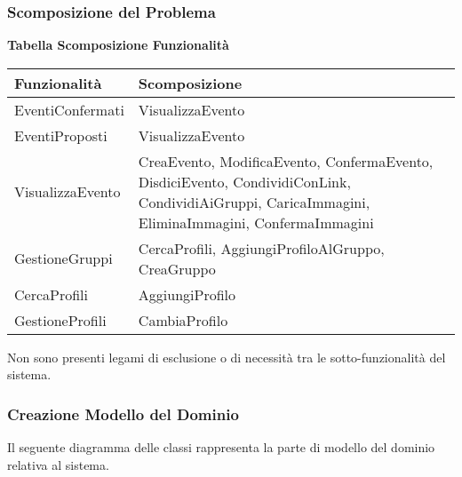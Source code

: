 \subsubsection{Scomposizione del Problema}
\hfill \break

\textbf{Tabella Scomposizione Funzionalità}
\hfill \break

\begin{tabular} {|P{7cm}|P{7cm}|}
    \hline
    \textbf{Funzionalità} & \textbf{Scomposizione}                                                                                                                            \\
    \hline
    EventiConfermati      & VisualizzaEvento                                                                                                                                  \\
    \hline
    EventiProposti        & VisualizzaEvento                                                                                                                                  \\
    \hline
    VisualizzaEvento      & CreaEvento, ModificaEvento, ConfermaEvento, DisdiciEvento, CondividiConLink, CondividiAiGruppi, CaricaImmagini, EliminaImmagini, ConfermaImmagini \\
    \hline
    GestioneGruppi        & CercaProfili, AggiungiProfiloAlGruppo, CreaGruppo                                                                                                 \\
    \hline
    CercaProfili          & AggiungiProfilo                                                                                                                                   \\
    \hline
    GestioneProfili       & CambiaProfilo                                                                                                                                     \\
    \hline
\end{tabular}
\hfill \break

Non sono presenti legami di esclusione o di necessità tra le sotto-funzionalità del sistema.

\newpage
\subsubsection{Creazione Modello del Dominio}

Il seguente diagramma delle classi rappresenta la parte di modello del dominio relativa al sistema. \\

